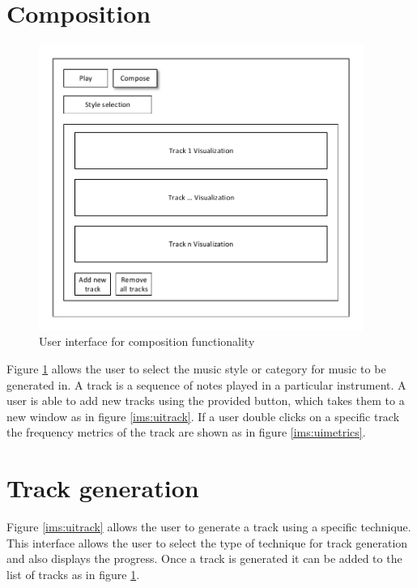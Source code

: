 \section{Composition}
\begin{figure}
\centerline{\includegraphics[width=400px]{../images/ui_compose.pdf}}
\caption{User interface for composition functionality}
\label{ims:uicompose}
\end{figure}


Figure \ref{ims:uicompose} allows the user to select the music style or category for music to be generated in. A track is a sequence of notes played in a particular instrument. A user is able to add new tracks using the provided button, which takes them to a new window as in figure \ref{ims:uitrack}. If a user double clicks on a specific track the frequency metrics of the track are shown as in figure \ref{ims:uimetrics}.


\section{Track generation}

Figure \ref{ims:uitrack} allows the user to generate a track using a specific technique. This interface allows the user to select the type of technique for track generation and also displays the progress. Once a track is generated it can be added to the list of tracks as in figure \ref{ims:uicompose}.


